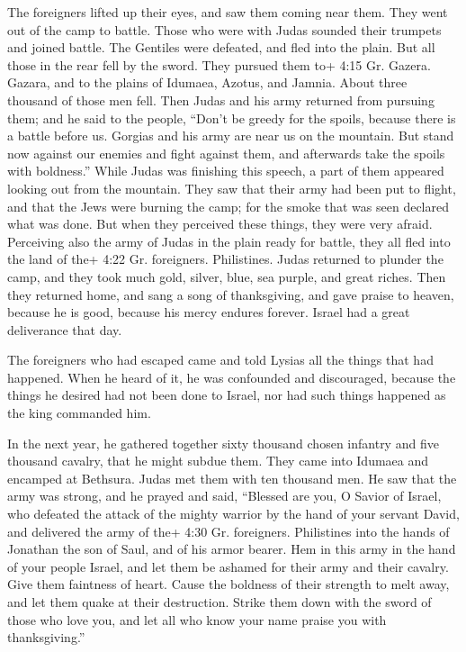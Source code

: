  The foreigners lifted up their eyes, and saw them coming
near them.  They went out of the camp to battle. Those who
were with Judas sounded their trumpets  and joined battle.
The Gentiles were defeated, and fled into the plain.  But
all those in the rear fell by the sword. They pursued them to+ 4:15 Gr.
Gazera. Gazara, and to the plains of Idumaea, Azotus, and Jamnia. About
three thousand of those men fell.  Then Judas and his army
returned from pursuing them;  and he said to the people,
``Don't be greedy for the spoils, because there is a battle before us.
 Gorgias and his army are near us on the mountain. But
stand now against our enemies and fight against them, and afterwards
take the spoils with boldness.''  While Judas was finishing
this speech, a part of them appeared looking out from the mountain.
 They saw that their army had been put to flight, and that
the Jews were burning the camp; for the smoke that was seen declared
what was done.  But when they perceived these things, they
were very afraid. Perceiving also the army of Judas in the plain ready
for battle,  they all fled into the land of the+ 4:22 Gr.
foreigners. Philistines.  Judas returned to plunder the
camp, and they took much gold, silver, blue, sea purple, and great
riches.  Then they returned home, and sang a song of
thanksgiving, and gave praise to heaven, because he is good, because his
mercy endures forever.  Israel had a great deliverance that
day.

 The foreigners who had escaped came and told Lysias all
the things that had happened.  When he heard of it, he was
confounded and discouraged, because the things he desired had not been
done to Israel, nor had such things happened as the king commanded him.

 In the next year, he gathered together sixty thousand
chosen infantry and five thousand cavalry, that he might subdue them.
 They came into Idumaea and encamped at Bethsura. Judas met
them with ten thousand men.  He saw that the army was
strong, and he prayed and said, ``Blessed are you, O Savior of Israel,
who defeated the attack of the mighty warrior by the hand of your
servant David, and delivered the army of the+ 4:30 Gr. foreigners.
Philistines into the hands of Jonathan the son of Saul, and of his armor
bearer.  Hem in this army in the hand of your people
Israel, and let them be ashamed for their army and their cavalry.
 Give them faintness of heart. Cause the boldness of their
strength to melt away, and let them quake at their destruction.
 Strike them down with the sword of those who love you, and
let all who know your name praise you with thanksgiving.''

